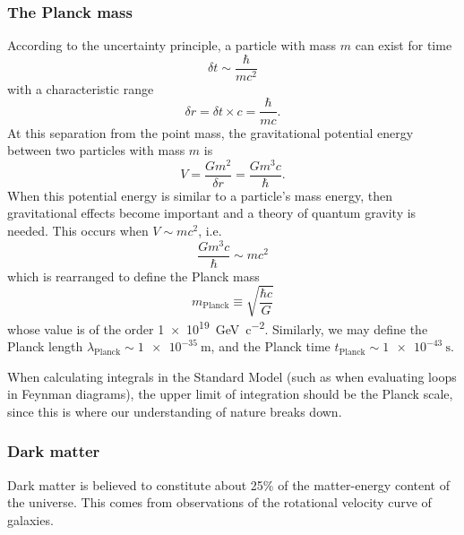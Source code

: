 \subsubsection{The Planck mass}
According to the uncertainty principle, a particle with mass $m$ can exist for time
\begin{equation}
\delta t \sim \frac{\hbar}{mc^2}
\end{equation}
with a characteristic range
\begin{equation}
\delta r = \delta t \times c = \frac{\hbar}{mc}.
\end{equation}
At this separation from the point mass, the gravitational potential energy between two particles with mass $m$ is
\begin{equation}
V = \frac{Gm^2}{\delta r} = \frac{Gm^3c}{\hbar}.
\end{equation}
When this potential energy is similar to a particle's mass energy, then gravitational effects become important and a theory of quantum gravity is needed. This occurs when $V \sim mc^2$, i.e.~
\begin{equation}
\frac{Gm^3c}{\hbar} \sim mc^2
\end{equation}
which is rearranged to define the Planck mass
\begin{equation}\boxed{
m_\text{Planck} \equiv \sqrt{\frac{\hbar c}{G}}
}
\end{equation}
whose value is of the order \SI[retain-unity-mantissa = false]{1e19}{\giga\electronvolt\per c^2}. Similarly, we may define the Planck length $\lambda_\text{Planck} \sim \SI[retain-unity-mantissa = false]{1e-35}{\meter}$, and the Planck time $t_\text{Planck} \sim \SI[retain-unity-mantissa = false]{1e-43}{\second}$.

When calculating integrals in the Standard Model (such as when evaluating loops in Feynman diagrams), the upper limit of integration should be the Planck scale, since this is where our understanding of nature breaks down.

\subsubsection{Dark matter}
Dark matter is believed to constitute about 25\% of the matter-energy content of the universe. This comes from observations of the rotational velocity curve of galaxies.

